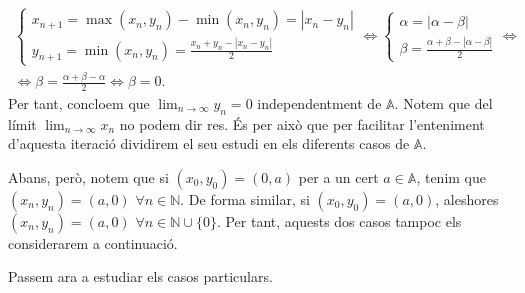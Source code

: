 \documentclass[11pt,a4paper]{article}
\theoremstyle{definition}
\begin{document}
\begin{multline*}
    \left\{\begin{array}{l}
        x_{n+1}=\max(x_n,y_n)-\min(x_n,y_n)=|x_n-y_n| \\
        y_{n+1}=\min(x_n,y_n)=\frac{x_n+y_n-|x_n-y_n|}{2}
    \end{array}\right.\iff\left\{\begin{array}{l}
        \alpha=|\alpha-\beta| \\
        \beta=\frac{\alpha+\beta-|\alpha-\beta|}{2}
    \end{array}\right.\iff\\\iff\beta=\frac{\alpha+\beta-\alpha}{2}\iff\beta=0.
\end{multline*}
Per tant, concloem que $\displaystyle\lim_{n\to\infty}y_n=0$ independentment de $\mathbb{A}$. Notem que del límit $\displaystyle\lim_{n\to\infty}x_n$ no podem dir res. És per això que per facilitar l'enteniment d'aquesta iteració dividirem el seu estudi en els diferents casos de $\mathbb{A}$.\par Abans, però, notem que si $(x_0,y_0)=(0,a)$ per a un cert $a\in\mathbb{A}$, tenim que $(x_n,y_n)=(a,0)$ $\forall n\in\mathbb{N}$. De forma similar, si $(x_0,y_0)=(a,0)$, aleshores $(x_n,y_n)=(a,0)$ $\forall n\in\mathbb{N}\cup\{0\}$. Per tant, aquests dos casos tampoc els considerarem a continuació.\par Passem ara a estudiar els casos particulars.
\end{document}
